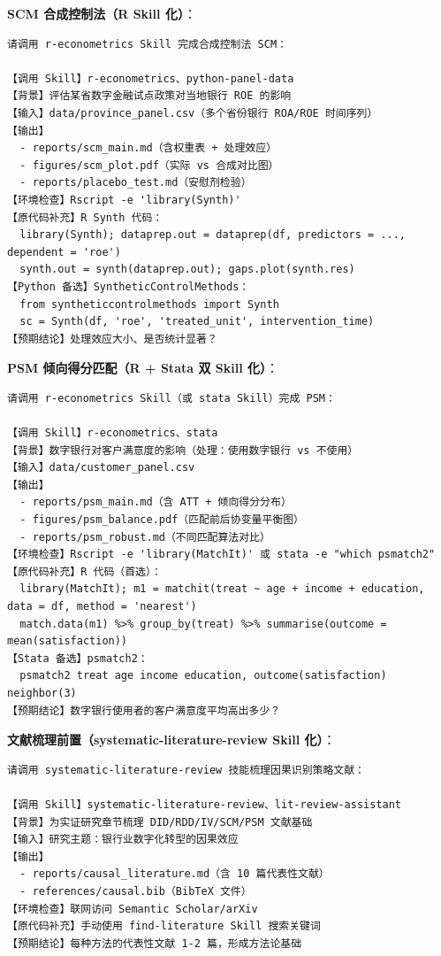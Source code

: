 \textbf{SCM 合成控制法（R Skill 化）}：
\begin{lstlisting}
请调用 r-econometrics Skill 完成合成控制法 SCM：

【调用 Skill】r-econometrics、python-panel-data
【背景】评估某省数字金融试点政策对当地银行 ROE 的影响
【输入】data/province_panel.csv（多个省份银行 ROA/ROE 时间序列）
【输出】
  - reports/scm_main.md（含权重表 + 处理效应）
  - figures/scm_plot.pdf（实际 vs 合成对比图）
  - reports/placebo_test.md（安慰剂检验）
【环境检查】Rscript -e 'library(Synth)'
【原代码补充】R Synth 代码：
  library(Synth); dataprep.out = dataprep(df, predictors = ..., dependent = 'roe')
  synth.out = synth(dataprep.out); gaps.plot(synth.res)
【Python 备选】SyntheticControlMethods：
  from syntheticcontrolmethods import Synth
  sc = Synth(df, 'roe', 'treated_unit', intervention_time)
【预期结论】处理效应大小、是否统计显著？
\end{lstlisting}

\textbf{PSM 倾向得分匹配（R + Stata 双 Skill 化）}：
\begin{lstlisting}
请调用 r-econometrics Skill（或 stata Skill）完成 PSM：

【调用 Skill】r-econometrics、stata
【背景】数字银行对客户满意度的影响（处理：使用数字银行 vs 不使用）
【输入】data/customer_panel.csv
【输出】
  - reports/psm_main.md（含 ATT + 倾向得分分布）
  - figures/psm_balance.pdf（匹配前后协变量平衡图）
  - reports/psm_robust.md（不同匹配算法对比）
【环境检查】Rscript -e 'library(MatchIt)' 或 stata -e "which psmatch2"
【原代码补充】R 代码（首选）：
  library(MatchIt); m1 = matchit(treat ~ age + income + education, data = df, method = 'nearest')
  match.data(m1) %>% group_by(treat) %>% summarise(outcome = mean(satisfaction))
【Stata 备选】psmatch2：
  psmatch2 treat age income education, outcome(satisfaction) neighbor(3)
【预期结论】数字银行使用者的客户满意度平均高出多少？
\end{lstlisting}

\textbf{文献梳理前置（systematic-literature-review Skill 化）}：
\begin{lstlisting}
请调用 systematic-literature-review 技能梳理因果识别策略文献：

【调用 Skill】systematic-literature-review、lit-review-assistant
【背景】为实证研究章节梳理 DID/RDD/IV/SCM/PSM 文献基础
【输入】研究主题：银行业数字化转型的因果效应
【输出】
  - reports/causal_literature.md（含 10 篇代表性文献）
  - references/causal.bib（BibTeX 文件）
【环境检查】联网访问 Semantic Scholar/arXiv
【原代码补充】手动使用 find-literature Skill 搜索关键词
【预期结论】每种方法的代表性文献 1-2 篇，形成方法论基础
\end{lstlisting}

